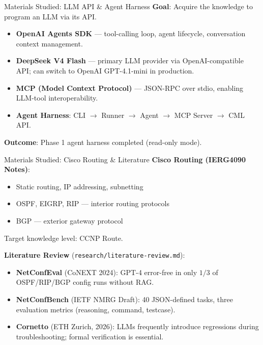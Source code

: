 \documentclass[11pt,aspectratio=169]{beamer}
\begin{document}
\begin{frame}{Materials Studied: LLM API \& Agent Harness}
  \textbf{Goal}: Acquire the knowledge to program an LLM via its API.

  \vspace{6pt}
  \begin{itemize}
    \item \textbf{OpenAI Agents SDK} --- tool-calling loop, agent lifecycle,
          conversation context management.
    \item \textbf{DeepSeek V4 Flash} --- primary LLM provider via
          OpenAI-compatible API; can switch to OpenAI GPT-4.1-mini in production.
    \item \textbf{MCP (Model Context Protocol)} --- JSON-RPC over stdio,
          enabling LLM-tool interoperability.
    \item \textbf{Agent Harness}: CLI $\to$ Runner $\to$ Agent $\to$ MCP Server
          $\to$ CML API.
  \end{itemize}

  \vspace{6pt}
  \textbf{Outcome}: Phase 1 agent harness completed (read-only mode).
\end{frame}

\begin{frame}{Materials Studied: Cisco Routing \& Literature}
  \textbf{Cisco Routing (IERG4090 Notes)}:
  \begin{itemize}
    \item Static routing, IP addressing, subnetting
    \item OSPF, EIGRP, RIP --- interior routing protocols
    \item BGP --- exterior gateway protocol
  \end{itemize}
  \small Target knowledge level: CCNP Route.

  \vspace{8pt}
  \textbf{Literature Review} (\texttt{research/literature-review.md}):
  \begin{itemize}
    \item \textbf{NetConfEval} (CoNEXT 2024): GPT-4 error-free in only
          $1/3$ of OSPF/RIP/BGP config runs without RAG.
    \item \textbf{NetConfBench} (IETF NMRG Draft): 40 JSON-defined tasks,
          three evaluation metrics (reasoning, command, testcase).
    \item \textbf{Cornetto} (ETH Zurich, 2026): LLMs frequently introduce
          regressions during troubleshooting; formal verification is essential.
  \end{itemize}
\end{frame}
\end{document}

